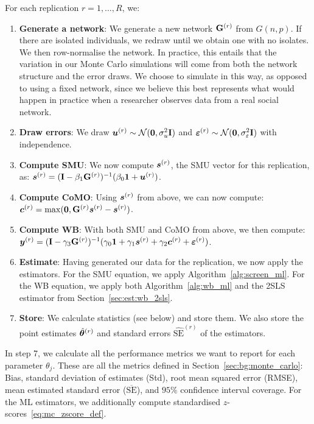 For each replication $r = 1, \ldots, R$, we:
\begin{enumerate}
    \item \textbf{Generate a network}: We generate a new network $\mathbf{G}^{(r)}$ from $G(n, p)$. If there are isolated individuals, we redraw until we obtain one with no isolates. We then row-normalise the network. In practice, this entails that the variation in our Monte Carlo simulations will come from both the network structure and the error draws. We choose to simulate in this way, as opposed to using a fixed network, since we believe this best represents what would happen in practice when a researcher observes data from a real social network.
    \item \textbf{Draw errors}: We draw $\bm{u}^{(r)} \sim \mathcal{N}(\bm{0}, \sigma_u^2\mathbf{I})$ and $\bm{\varepsilon}^{(r)} \sim \mathcal{N}(\bm{0}, \sigma_\varepsilon^2\mathbf{I})$ with independence.
    \item \textbf{Compute SMU}: We now compute $\bm{s}^{(r)}$, the SMU vector for this replication, as: $\bm{s}^{(r)} = (\mathbf{I} - \beta_1\mathbf{G}^{(r)})^{-1}(\beta_0\bm{1} + \bm{u}^{(r)})$.
    \item \textbf{Compute CoMO}: Using $\bm{s}^{(r)}$ from above, we can now compute: $\bm{c}^{(r)} = \max(\bm{0}, \mathbf{G}^{(r)}\bm{s}^{(r)} - \bm{s}^{(r)})$.
    \item \textbf{Compute WB}: With both SMU and CoMO from above, we then compute: $\bm{y}^{(r)} = (\mathbf{I} - \gamma_3\mathbf{G}^{(r)})^{-1}(\gamma_0\bm{1} + \gamma_1\bm{s}^{(r)} + \gamma_2\bm{c}^{(r)} + \bm{\varepsilon}^{(r)})$.
    \item \textbf{Estimate}: Having generated our data for the replication, we now apply the estimators. For the SMU equation, we apply Algorithm~\ref{alg:screen_ml}. For the WB equation, we apply both Algorithm~\ref{alg:wb_ml} and the 2SLS estimator from Section~\ref{sec:est:wb_2sls}.
    \item \textbf{Store}: We calculate statistics (see below) and store them. We also store the point estimates $\hat{\bm{\theta}}^{(r)}$ and standard errors $\widehat{\text{SE}}^{(r)}$ of the estimators.
\end{enumerate}

In step 7, we calculate all the performance metrics we want to report for each parameter $\theta_j$. These are all the metrics defined in Section~\ref{sec:bg:monte_carlo}: Bias, standard deviation of estimates (Std), root mean squared error (RMSE), mean estimated standard error ($\overline{\text{SE}}$), and $95\%$ confidence interval coverage. For the ML estimators, we additionally compute standardised $z$-scores~\eqref{eq:mc_zscore_def}.

